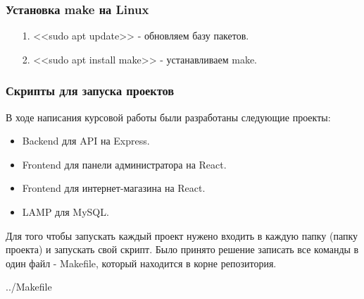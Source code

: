 
\subsubsection*{Установка make на Linux}

\begin{itemize}
    \item[1.] <<sudo apt update>> - обновляем базу пакетов.
    \item[2.] <<sudo apt install make>> - устанавливаем make.
\end{itemize}

\newpage


\subsubsection*{Скрипты для запуска проектов}

В ходе написания курсовой работы были разработаны следующие проекты:

\begin{itemize}
    \item Backend для API на Express.
    \item Frontend для панели администратора на React.
    \item Frontend для интернет-магазина на React.
    \item LAMP для MySQL.
\end{itemize}

Для того чтобы запускать каждый проект нужено входить в каждую папку (папку проекта)
и запускать свой скрипт. Было принято решение записать все команды в один файл - Makefile,
который находится в корне репозитория.


    {../Makefile}

\newpage
